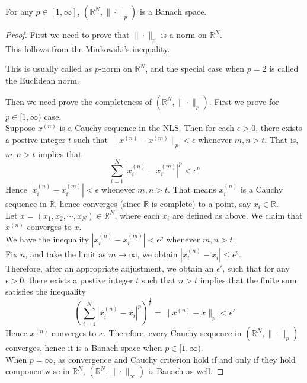 \begin{eg}
    For any $p\in[1,\infty]$, $(\mathbb{R}^{N},\|\cdot\|_{p})$ is a Banach space.
    \begin{proof}
        First we need to prove that $\|\cdot\|_{p}$ is a norm on $\mathbb{R}^{N}$.\\ 
        This follows from the \hyperlink{minkowski}{Minkowski's inequality}.
        \begin{note}
            This is usually called as $p$-norm on $\mathbb{R}^{N}$, and the special case when $p=2$ is called the Euclidean norm.
        \end{note}
        Then we need prove the completeness of $(\mathbb{R}^{N},\|\cdot\|_{p})$. First we prove for $p\in[1,\infty)$ case.\\
        Suppose $x^{(n)}$ is a Cauchy sequence in the NLS. Then for each $\epsilon>0$, there exists a postive integer $t$ such that $\|x^{(n)}-x^{(m)}\|_{p}<\epsilon$ whenever $m,n>t$. That is, $m,n>t$ implies that $$\sum_{i=1}^{N}\left|x^{(n)}_{i}-x_{i}^{(m)}\right|^{p}<\epsilon^{p}$$
        Hence $\left|x_{i}^{(n)}-x_{i}^{(m)}\right|<\epsilon$ whenever $m,n>t$. That means $x_{i}^{(n)}$ is a Cauchy sequence in $\mathbb{R}$, hence converges (since $\mathbb{R}$ is complete) to a point, say $x_{i}\in \mathbb{R}$.\\
        Let $x=(x_{1},x_{2},\cdots,x_{N})\in \mathbb{R}^{N}$, where each $x_{i}$ are defined as above. We claim that $x^{(n)}$ converges to $x$.\\ 
        We have the inequality $|x_{i}^{(n)}-x_{i}^{(m)}|<\epsilon^{p}$ whenever $m,n>t$.\\ 
        Fix $n$, and take the limit as $m\to\infty$, we obtain $|x_{i}^{(n)}-x_{i}|\leq\epsilon^{p}$.\\ 
        Therefore, after an appropriate adjustment, we obtain an $\epsilon'$, such that for any $\epsilon>0$, there exists a postive integer $t$ such that $n>t$ implies that the finite sum satisfies the inequality $$\left(\sum_{i=1}^{N}\left|x_{i}^{(n)}-x_{i}\right|^{p}\right)^{\frac{1}{p}}=\|x^{(n)}-x\|_{p}<\epsilon'$$
        Hence $x^{(n)}$ converges to $x$.
        Therefore, every Cauchy sequence in $(\mathbb{R}^{N},\|\cdot\|_{p})$ converges, hence it is a Banach space when $p\in[1,\infty)$.\\ 
        When $p=\infty$, as convergence and Cauchy criterion hold if and only if they hold componentwise in $\mathbb{R}^{N}$, $(\mathbb{R}^{N},\|\cdot\|_{\infty})$ is Banach as well.
    \end{proof}
\end{eg}
